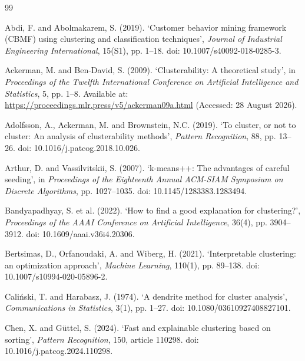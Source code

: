 \begin{thebibliography}{99}

Abdi, F. and Abolmakarem, S. (2019). `Customer behavior mining framework (CBMF) using clustering and classification techniques', \emph{Journal of Industrial Engineering International}, 15(S1), pp. 1--18. doi: 10.1007/s40092-018-0285-3.

Ackerman, M. and Ben-David, S. (2009). `Clusterability: A theoretical study', in \emph{Proceedings of the Twelfth International Conference on Artificial Intelligence and Statistics}, 5, pp. 1--8. Available at: \url{https://proceedings.mlr.press/v5/ackerman09a.html} (Accessed: 28 August 2026).

Adolfsson, A., Ackerman, M. and Brownstein, N.C. (2019). `To cluster, or not to cluster: An analysis of clusterability methods', \emph{Pattern Recognition}, 88, pp. 13--26. doi: 10.1016/j.patcog.2018.10.026.

Arthur, D. and Vassilvitskii, S. (2007). `k-means++: The advantages of careful seeding', in \emph{Proceedings of the Eighteenth Annual ACM-SIAM Symposium on Discrete Algorithms}, pp. 1027--1035. doi: 10.1145/1283383.1283494.

Bandyapadhyay, S. et al. (2022). `How to find a good explanation for clustering?', \emph{Proceedings of the AAAI Conference on Artificial Intelligence}, 36(4), pp. 3904--3912. doi: 10.1609/aaai.v36i4.20306.

Bertsimas, D., Orfanoudaki, A. and Wiberg, H. (2021). `Interpretable clustering: an optimization approach', \emph{Machine Learning}, 110(1), pp. 89--138. doi: 10.1007/s10994-020-05896-2.

Cali{\'n}ski, T. and Harabasz, J. (1974). `A dendrite method for cluster analysis', \emph{Communications in Statistics}, 3(1), pp. 1--27. doi: 10.1080/03610927408827101.

Chen, X. and G{\"u}ttel, S. (2024). `Fast and explainable clustering based on sorting', \emph{Pattern Recognition}, 150, article 110298. doi: 10.1016/j.patcog.2024.110298.


\end{thebibliography}
